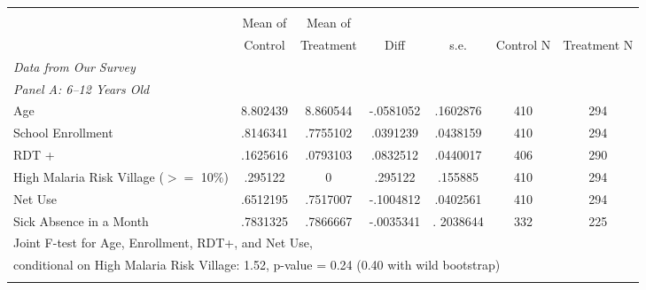 {
\begin{tabular}{l*{1}{cccccc}}
\hline\hline
                                                                           \\
                                                                           &Mean of& Mean of&&&&\\
       &   Control&    Treatment&        Diff&        s.e.& Control N&  Treatment N\\
              \multicolumn{6}{l}{\it Data from Our Survey}        \\
\hline

       \multicolumn{6}{l}{\it Panel A:  6--12 Years Old}        \\
\hline
Age       &    8.802439&    8.860544&   -.0581052&    .1602876&         410&         294\\
School Enrollment      &    .8146341&    .7755102&    .0391239&     .0438159&         410&         294\\
RDT +         &    .1625616&    .0793103&    .0832512\sym{+}&    .0440017&         406&         290\\
High Malaria Risk Village ($>=$ 10\%) &     .295122&           0&     .295122\sym{+}&     .155885&         410&         294\\
Net Use         &    .6512195&    .7517007&   -.1004812\sym{*}&    .0402561 &         410&         294\\
Sick Absence in a Month    &    .7831325&    .7866667&   -.0035341&    . 2038644&         332&         225\\
\multicolumn{7}{l}{Joint F-test for Age, Enrollment,  RDT+, and Net Use,}\\
\multicolumn{7}{l}{conditional on High Malaria Risk Village:  1.52, p-value = 0.24 (0.40 with wild bootstrap)} \\
\\

\end{tabular}}
